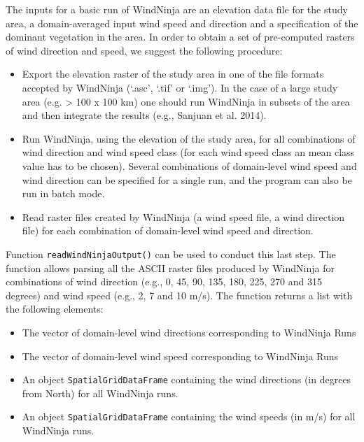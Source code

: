 \documentclass[11pt,a4paper]{article}
\begin{document}
The inputs for a basic run of WindNinja are an elevation data file for the study area, a domain-averaged input wind speed and direction and a specification of the dominant vegetation in the area. In order to obtain a set of pre-computed rasters of wind direction and speed, we suggest the following procedure:
\begin{itemize}
\item{Export the elevation raster of the study area in one of the file formats accepted by WindNinja (`.asc', `.tif' or `.img'). In the case of a large study area (e.g. > 100 x 100 km) one should run WindNinja in subsets of the area and then integrate the results (e.g., Sanjuan et al. 2014).}
\item{Run WindNinja, using the elevation of the study area, for all combinations of wind direction and wind speed class (for each wind speed class an mean class value has to be chosen). Several combinations of domain-level wind speed and wind direction can be specified for a single run, and the program can also be run in batch mode.}
\item{Read raster files created by WindNinja (a wind speed file, a wind direction file) for each combination of domain-level wind speed and direction. }
\end{itemize}
Function \texttt{readWindNinjaOutput()} can be used to conduct this last step. The function allows parsing all the ASCII raster files produced by WindNinja for combinations of wind direction (e.g., 0, 45, 90, 135, 180, 225, 270 and 315 degrees) and wind speed (e.g., 2, 7 and 10 m/s). The function returns a list with the following elements:
\begin{itemize}
\item{The vector of domain-level wind directions corresponding to WindNinja Runs}
\item{The vector of domain-level wind speed corresponding to WindNinja Runs}
\item{An object \texttt{SpatialGridDataFrame} containing the wind directions (in degrees from North) for all WindNinja runs.}
\item{An object \texttt{SpatialGridDataFrame} containing the wind speeds (in m/s) for all WindNinja runs.}
\end{itemize}
\end{document}
